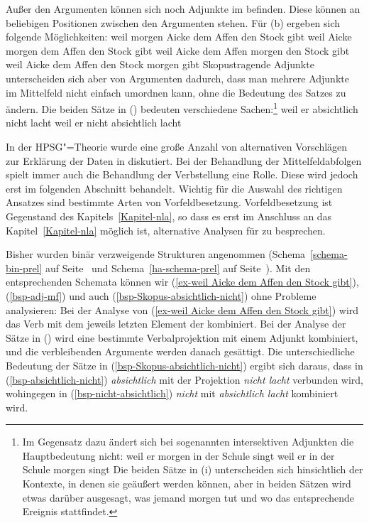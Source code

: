 Außer den Argumenten können sich noch Adjunkte im \mf befinden. Diese können
an beliebigen Positionen zwischen den Argumenten stehen. Für (b) ergeben
sich \zb folgende Möglichkeiten:
\eal
\label{bsp-adj-mf}
\ex weil morgen Aicke dem Affen den Stock gibt
\ex weil Aicke morgen dem Affen den Stock gibt
\ex weil Aicke dem Affen morgen den Stock gibt
\ex weil Aicke dem Affen den Stock morgen gibt
\zl
Skopustragende Adjunkte unterscheiden sich aber von Argumenten dadurch, dass man mehrere
Adjunkte im Mittelfeld nicht einfach umordnen kann, ohne die Bedeutung des Satzes zu ändern.
Die beiden Sätze in () bedeuten verschiedene Sachen:\footnote{
  Im Gegensatz dazu ändert sich bei sogenannten intersektiven Adjunkten die Hauptbedeutung nicht:
\eal
\ex weil er morgen in der Schule singt
\ex weil er in der Schule morgen singt
\zl
Die beiden Sätze in (i) unterscheiden sich hinsichtlich der Kontexte, in denen sie geäußert
werden können, aber in beiden Sätzen wird etwas darüber ausgesagt, was jemand morgen tut und wo
das entsprechende Ereignis stattfindet.%
}
\eal{}
\label{bsp-Skopus-absichtlich-nicht}
\ex
\label{bsp-absichtlich-nicht}
weil er absichtlich nicht lacht
\ex\label{bsp-nicht-absichtlich}
weil er nicht absichtlich lacht
\zl

\noindent
In der HPSG"=Theorie wurde eine große Anzahl von alternativen Vorschlägen zur Erklärung der
Daten in  diskutiert. Bei der Behandlung der Mittelfeldabfolgen
spielt immer auch die Behandlung der Verbstellung eine Rolle. Diese wird jedoch erst im
folgenden Abschnitt behandelt. Wichtig für die Auswahl des richtigen Ansatzes sind
bestimmte Arten von Vorfeldbesetzung. Vorfeldbesetzung ist Gegenstand des Kapitels~\ref{Kapitel-nla},
so dass es erst im Anschluss an das Kapitel~\ref{Kapitel-nla} möglich ist, alternative
Analysen für  zu besprechen.

Bisher wurden binär verzweigende Strukturen angenommen (Schema~\ref{schema-bin-prel} auf
Seite~\pageref{schema-bin-prel} und Schema~\ref{ha-schema-prel} auf Seite~\pageref{ha-schema-prel}).
Mit den entsprechenden Schemata können wir (\ref{ex-weil Aicke dem Affen den Stock gibt}), (\ref{bsp-adj-mf}) und auch (\ref{bsp-Skopus-absichtlich-nicht})
ohne Probleme analysieren: Bei der Analyse von (\ref{ex-weil Aicke dem Affen den Stock gibt}) wird das Verb mit dem jeweils
letzten Element der \compsl kombiniert. Bei der Analyse der Sätze in ()
wird eine bestimmte Verbalprojektion mit einem Adjunkt kombiniert, und die verbleibenden
Argumente werden danach gesättigt. Die unterschiedliche Bedeutung der Sätze in (\ref{bsp-Skopus-absichtlich-nicht})
ergibt sich daraus, dass in (\ref{bsp-absichtlich-nicht}) \emph{absichtlich} mit der Projektion \emph{nicht lacht} verbunden
wird, wohingegen in (\ref{bsp-nicht-absichtlich}) \emph{nicht} mit \emph{absichtlich lacht} kombiniert wird.

